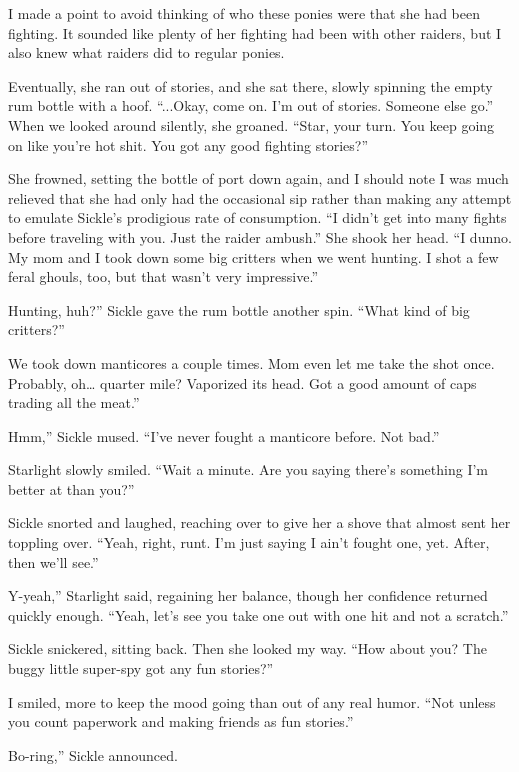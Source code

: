 I made a point to avoid thinking of who these ponies were that she had been fighting. It sounded like plenty of her fighting had been with other raiders, but I also knew what raiders did to regular ponies.

Eventually, she ran out of stories, and she sat there, slowly spinning the empty rum bottle with a hoof. “...Okay, come on. I’m out of stories. Someone else go.” When we looked around silently, she groaned. “Star, your turn. You keep going on like you’re hot shit. You got any good fighting stories?”

She frowned, setting the bottle of port down again, and I should note I was much relieved that she had only had the occasional sip rather than making any attempt to emulate Sickle’s prodigious rate of consumption. “I didn’t get into many fights before traveling with you. Just the raider ambush.” She shook her head. “I dunno. My mom and I took down some big critters when we went hunting. I shot a few feral ghouls, too, but that wasn’t very impressive.”

\leavevmode{}Hunting, huh?” Sickle gave the rum bottle another spin. “What kind of big critters?”

\leavevmode{}We took down manticores a couple times. Mom even let me take the shot once. Probably, oh… quarter mile? Vaporized its head. Got a good amount of caps trading all the meat.”

\leavevmode{}Hmm,” Sickle mused. “I’ve never fought a manticore before. Not bad.”

Starlight slowly smiled. “Wait a minute. Are you saying there’s something I’m better at than you?”

Sickle snorted and laughed, reaching over to give her a shove that almost sent her toppling over. “Yeah, right, runt. I’m just saying I ain’t fought one, yet. After, then we’ll see.”

\leavevmode{}Y-yeah,” Starlight said, regaining her balance, though her confidence returned quickly enough. “Yeah, let’s see you take one out with one hit and not a scratch.”

Sickle snickered, sitting back. Then she looked my way. “How about you? The buggy little super-spy got any fun stories?”

I smiled, more to keep the mood going than out of any real humor. “Not unless you count paperwork and making friends as fun stories.”

\leavevmode{}Bo-ring,” Sickle announced.

